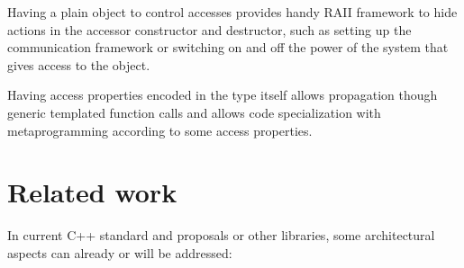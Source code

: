 \documentclass[a4paper]{article}
\begin{document}
Having a plain object to control accesses provides handy RAII
framework to hide actions in the accessor constructor and destructor,
such as setting up the communication framework or switching on and off
the power of the system that gives access to the object.

Having access properties encoded in the type itself allows propagation
though generic templated function calls and allows code specialization
with metaprogramming according to some access properties.


\section{Related work}
\label{sec:related-work}

In current C++ standard and proposals or other libraries, some
architectural aspects can already or will be addressed:
\end{document}
